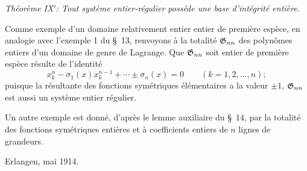 \emph{Théorème IX$'$: Tout système entier-régulier possède une base d'intégrité entière.}

Comme exemple d'un domaine relativement entier entier de première espèce, en analogie avec l'exemple 1 du \S\ 13, renvoyons à la totalité $\mathfrak{G}_{nn}$ des polynômes entiers d'un domaine de genre de Lagrange. Que $\mathfrak{G}_{nn}$ soit entier de première espèce résulte de l'identité
\[
  x_k^n-\sigma_1(x)x_k^{n-1}+\cdots\pm\sigma_n(x)=0
  \qquad(k=1,2,
\ldots,n);
\]
puisque la résultante des fonctions symétriques élémentaires a la valeur $\pm1$, $\mathfrak{G}_{nn}$ est aussi un système entier régulier.

Un autre exemple est donné, d'après le lemme auxiliaire du \S\ 14, par la totalité des fonctions symétriques entières et à coefficients entiers de $n$ lignes de grandeurs.

Erlangen, mai 1914.
